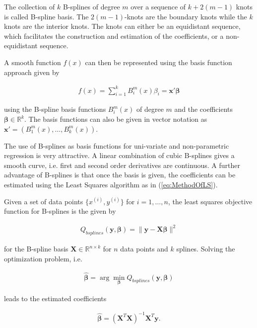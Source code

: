 \documentclass[10pt,a4paper]{article}
\begin{document}
The collection of $k$ B-splines of degree $m$ over a sequence of $k+2(m-1)$ knots is called B-spline basis. The $2(m-1)$-knots are the boundary knots while the $k$ knots are the interior knots. The knots can either be an equidistant sequence, which facilitates the construction and estimation of the coefficients, or a non-equidistant sequence.

A smooth function $f(x)$ can then be represented using the basis function approach given by

\begin{align} \label{eq:bspline_bf_approach}
	f(x) = \sum_{i=1}^k B_i^m(x) \beta_i = \boldsymbol{x}' \boldsymbol{\beta}
\end{align}

using the B-spline basis functions $B_i^m(x)$  of degree $m$ and the coefficients $\boldsymbol{\beta} \in \mathbb{R}^{k}$. The basis functions can also be given in vector notation as $\boldsymbol{x}' = (B_1^m(x), \dots, B_k^m(x))$. 

The use of B-splines as basis functions for uni-variate and non-parametric regression is very attractive. A linear combination of cubic B-splines gives a smooth curve, i.e. first and second order derivatives are continuous. A further advantage of B-splines is that once the basis is given, the coefficients can be estimated using the Least Squares algorithm as in (\ref{eq:MethodOfLS}). 

Given a set of data points $\{x^{(i)}, y^{(i)}\}$ for $i = 1, \dots, n$, the least squares objective function for B-splines is the given by

\begin{align} \label{eq:OF_Bsplines}
	Q_{bsplines}(\boldsymbol{y}, \boldsymbol{\beta}) = \lVert \boldsymbol{y} - \boldsymbol{X} \boldsymbol{\beta} \rVert^2
\end{align}

for the B-spline basis $\boldsymbol{X} \in \mathbb{R}^{n \times k}$ for $n$ data points and $k$ splines. Solving the optimization problem, i.e.

\begin{align} \label{eq:opti_problem_bsplines}
	\boldsymbol{\hat{\beta}} = \arg \min_{\boldsymbol{\beta}} Q_{bsplines}(\boldsymbol{y}, \boldsymbol{\beta})
\end{align}

leads to the estimated coefficients 

\begin{align}
	\boldsymbol{\hat{\beta}} = (\boldsymbol{X}^T \boldsymbol{X})^{-1} \boldsymbol{X}^T \boldsymbol{y}.
\end{align}
\end{document}
